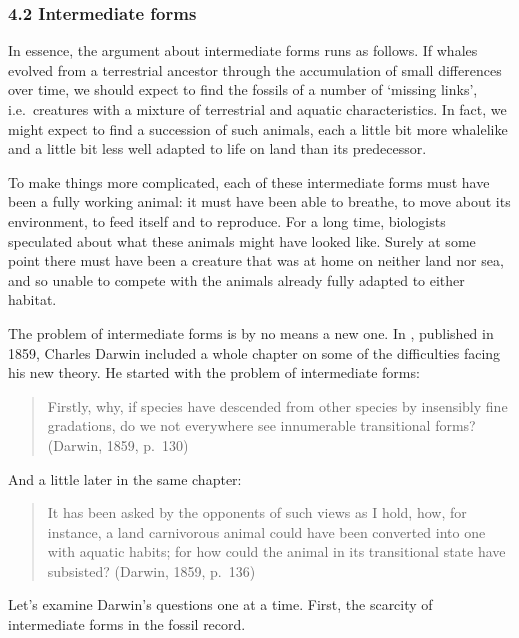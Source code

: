 \documentclass[letterpaper,10pt,english]{sphinxmanual}
\begin{document}
\subsubsection{4.2 Intermediate forms}
\label{\detokenize{content/session_00/Part_00_04:4.2-Intermediate-forms}}
In essence, the argument about intermediate forms runs as follows. If whales evolved from a terrestrial ancestor through the accumulation of small differences over time, we should expect to find the fossils of a number of ‘missing links’, i.e. creatures with a mixture of terrestrial and aquatic characteristics. In fact, we might expect to find a succession of such animals, each a little bit more whale\sphinxhyphen{}like and a little bit less well adapted to life on land than its predecessor.

To make things more complicated, each of these intermediate forms must have been a fully working animal: it must have been able to breathe, to move about its environment, to feed itself and to reproduce. For a long time, biologists speculated about what these animals might have looked like. Surely at some point there must have been a creature that was at home on neither land nor sea, and so unable to compete with the animals already fully adapted to either habitat.

The problem of intermediate forms is by no means a new one. In , published in 1859, Charles Darwin included a whole chapter on some of the difficulties facing his new theory. He started with the problem of intermediate forms:


\begin{quote}

Firstly, why, if species have descended from other species by insensibly fine gradations, do we not everywhere see innumerable transitional forms? (Darwin, 1859, p. 130)
\end{quote}

And a little later in the same chapter:


\begin{quote}

It has been asked by the opponents of such views as I hold, how, for instance, a land carnivorous animal could have been converted into one with aquatic habits; for how could the animal in its transitional state have subsisted? (Darwin, 1859, p. 136)
\end{quote}

Let’s examine Darwin’s questions one at a time. First, the scarcity of intermediate forms in the fossil record.
\end{document}
